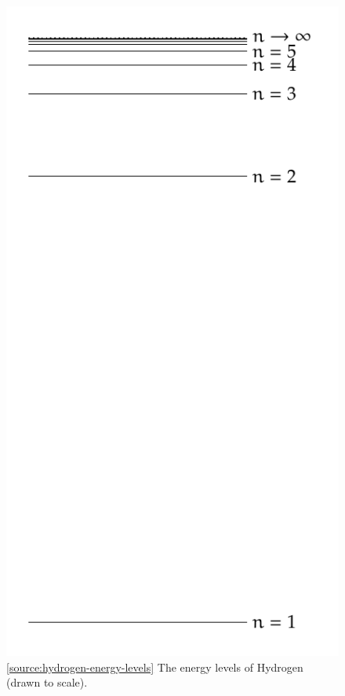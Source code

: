 \documentclass[oneside]{book}
\begin{document}
\begin{figure}[H]
    \centering
    \includegraphics[height=0.5\textheight,angle=90]{../images/Energy-Level/Energy-Level.pdf}
    \caption{\ref{source:hydrogen-energy-levels} The energy levels of Hydrogen (drawn to scale).}
    \label{fig:hydrogen-energy-levels}
\end{figure}
\newpage
\null
\vfill
\end{document}
